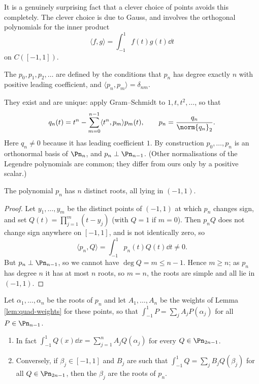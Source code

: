 It is a genuinely surprising fact that a clever choice of points avoids this completely. The clever choice is due to Gauss, and involves the orthogonal polynomials for the inner product
$$\langle f,g\rangle = \int_{-1}^1 f(t)g(t)\dd t$$
on $C([-1,1])$.

\begin{definition}
	The  $p_0,p_1,p_2,\ldots$ are defined by the conditions that $p_n$ has degree exactly $n$ with positive leading coefficient, and $\langle p_n,p_m\rangle = \delta_{nm}$.
\end{definition}

They exist and are unique: apply Gram--Schmidt to $1,t,t^2,\ldots$, so that
$$q_n(t) = t^n - \sum_{m=0}^{n-1}\langle t^n,p_m\rangle p_m(t), \qquad p_n = \frac{q_n}{\norm{q_n}_2}.$$
Here $q_n\neq0$ because it has leading coefficient $1$. By construction $p_0,\ldots,p_n$ is an orthonormal basis of $\Pn_n$, and $p_n\perp \Pn_{n-1}$. (Other normalisations of the Legendre polynomials are common; they differ from ours only by a positive scalar.)

\begin{lemma}\label{lem:legendre-roots}
	The polynomial $p_n$ has $n$ distinct roots, all lying in $(-1,1)$.
\end{lemma}

\begin{proof}
	Let $y_1,\ldots,y_m$ be the distinct points of $(-1,1)$ at which $p_n$ changes sign, and set $Q(t) = \prod_{j=1}^m(t-y_j)$ (with $Q=1$ if $m=0$). Then $p_nQ$ does not change sign anywhere on $[-1,1]$, and is not identically zero, so
	$$\langle p_n, Q\rangle = \int_{-1}^1 p_n(t)Q(t)\dd t \neq 0.$$
	But $p_n\perp\Pn_{n-1}$, so we cannot have $\deg Q = m \leq n-1$. Hence $m \geq n$; as $p_n$ has degree $n$ it has at most $n$ roots, so $m=n$, the roots are simple and all lie in $(-1,1)$.
\end{proof}

\begin{theorem}\label{thm:gauss-quad}
	Let $\alpha_1,\ldots,\alpha_n$ be the roots of $p_n$ and let $A_1,\ldots,A_n$ be the weights of Lemma \ref{lem:quad-weights} for these points, so that $\int_{-1}^1 P = \sum_j A_jP(\alpha_j)$ for all $P \in \Pn_{n-1}$.
	\begin{enumerate}[label=(\roman*)]
		\item In fact $\int_{-1}^1 Q(x)\dd x = \sum_{j=1}^nA_jQ(\alpha_j)$ for every $Q\in\Pn_{2n-1}$.
		\item Conversely, if $\beta_j\in[-1,1]$ and $B_j$ are such that $\int_{-1}^1 Q = \sum_j B_jQ(\beta_j)$ for all $Q\in\Pn_{2n-1}$, then the $\beta_j$ are the roots of $p_n$.
	\end{enumerate}
\end{theorem}

